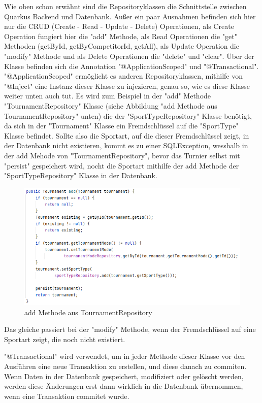 Wie oben schon erwähnt sind die Repositoryklassen die Schnittstelle zwischen Quarkus Backend und Datenbank. Außer ein paar Ausnahmen befinden sich hier nur die CRUD (Create - Read - Update - Delete) Operationen, 
als Create Operation fungiert hier die "add" Methode, als Read Operationen die "get" Methoden (getById, getByCompetitorId, getAll), als Update Operation die "modify" Methode und als Delete Operationen die "delete" und "clear". 
Über der Klasse befinden sich die Annotation "@ApplicationScoped" und "@Transactional". "@ApplicationScoped" ermöglicht es anderen Repositoryklassen, mithilfe von "@Inject" eine Instanz dieser Klasse zu injezieren, genau so, 
wie es diese Klasse weiter unten auch tut. Es wird zum Beispiel in der "add" Methode "TournamentRepository" Klasse (siehe Abbildung "add Methode aus TournamentRepository" unten) die 
der "SportTypeRepository" Klasse benötigt, da sich in der "Tournament" Klasse ein Fremdschlüssel auf die "SportType" Klasse befindet. Sollte also die Sportart, 
auf die dieser Fremdschlüssel zeigt, in der Datenbank nicht existieren, kommt es zu einer SQLException, wesshalb in der add Mehode von "TournamentRepository", 
bevor das Turnier selbst mit "persist" gespeichert wird, nocht die Sportart mithilfe der add Methode der "SportTypeRepository" Klasse in der Datenbank. 

\begin{figure}[H]
    \includegraphics[scale=0.8]{pics/repository_add_function.png}
    \caption{add Methode aus TournamentRepository}
\end{figure}

Das gleiche passiert bei der "modify" Methode, wenn der Fremdschlüssel auf eine Sportart zeigt, die noch nicht existiert.

"@Transactional" wird verwendet, um in jeder Methode dieser Klasse vor den Ausführen eine neue Transaktion zu erstellen, und diese danach zu commiten. 
Wenn Daten in der Datenbank gespeichert, modifiziert oder gelöscht werden, werden diese Änderungen erst dann wirklich in die Datenbank übernommen, wenn eine Transaktion commitet wurde.

